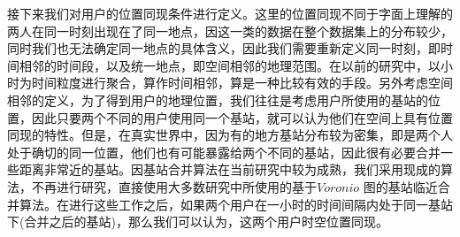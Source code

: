 接下来我们对用户的位置同现条件进行定义。这里的位置同现不同于字面上理解的两人在同一时刻出现在了同一地点，因这一类的数据在整个数据集上的分布较少，同时我们也无法确定同一地点的具体含义，因此我们需要重新定义同一时刻，即时间相邻的时间段，以及统一地点，即空间相邻的地理范围。在以前的研究中，以小时为时间粒度进行聚合，算作时间相邻，算是一种比较有效的手段。另外考虑空间相邻的定义，为了得到用户的地理位置，我们往往是考虑用户所使用的基站的位置，因此只要两个不同的用户使用同一个基站，就可以认为他们在空间上具有位置同现的特性。但是，在真实世界中，因为有的地方基站分布较为密集，即是两个人处于确切的同一位置，他们也有可能暴露给两个不同的基站，因此很有必要合并一些距离非常近的基站。因基站合并算法在当前研究中较为成熟，我们采用现成的算法，不再进行研究，直接使用大多数研究中所使用的基于$Voronio$ 图的基站临近合并算法。在进行这些工作之后，如果两个用户在一小时的时间间隔内处于同一基站下(合并之后的基站)，那么我们可以认为，这两个用户时空位置同现。
























































